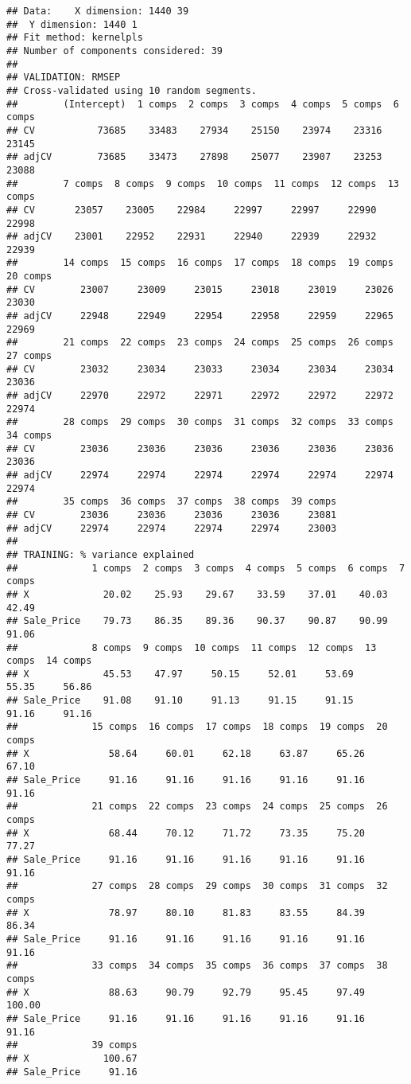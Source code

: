 \documentclass[
]{article}
\begin{document}
\begin{verbatim}
## Data:    X dimension: 1440 39 
##  Y dimension: 1440 1
## Fit method: kernelpls
## Number of components considered: 39
## 
## VALIDATION: RMSEP
## Cross-validated using 10 random segments.
##        (Intercept)  1 comps  2 comps  3 comps  4 comps  5 comps  6 comps
## CV           73685    33483    27934    25150    23974    23316    23145
## adjCV        73685    33473    27898    25077    23907    23253    23088
##        7 comps  8 comps  9 comps  10 comps  11 comps  12 comps  13 comps
## CV       23057    23005    22984     22997     22997     22990     22998
## adjCV    23001    22952    22931     22940     22939     22932     22939
##        14 comps  15 comps  16 comps  17 comps  18 comps  19 comps  20 comps
## CV        23007     23009     23015     23018     23019     23026     23030
## adjCV     22948     22949     22954     22958     22959     22965     22969
##        21 comps  22 comps  23 comps  24 comps  25 comps  26 comps  27 comps
## CV        23032     23034     23033     23034     23034     23034     23036
## adjCV     22970     22972     22971     22972     22972     22972     22974
##        28 comps  29 comps  30 comps  31 comps  32 comps  33 comps  34 comps
## CV        23036     23036     23036     23036     23036     23036     23036
## adjCV     22974     22974     22974     22974     22974     22974     22974
##        35 comps  36 comps  37 comps  38 comps  39 comps
## CV        23036     23036     23036     23036     23081
## adjCV     22974     22974     22974     22974     23003
## 
## TRAINING: % variance explained
##             1 comps  2 comps  3 comps  4 comps  5 comps  6 comps  7 comps
## X             20.02    25.93    29.67    33.59    37.01    40.03    42.49
## Sale_Price    79.73    86.35    89.36    90.37    90.87    90.99    91.06
##             8 comps  9 comps  10 comps  11 comps  12 comps  13 comps  14 comps
## X             45.53    47.97     50.15     52.01     53.69     55.35     56.86
## Sale_Price    91.08    91.10     91.13     91.15     91.15     91.16     91.16
##             15 comps  16 comps  17 comps  18 comps  19 comps  20 comps
## X              58.64     60.01     62.18     63.87     65.26     67.10
## Sale_Price     91.16     91.16     91.16     91.16     91.16     91.16
##             21 comps  22 comps  23 comps  24 comps  25 comps  26 comps
## X              68.44     70.12     71.72     73.35     75.20     77.27
## Sale_Price     91.16     91.16     91.16     91.16     91.16     91.16
##             27 comps  28 comps  29 comps  30 comps  31 comps  32 comps
## X              78.97     80.10     81.83     83.55     84.39     86.34
## Sale_Price     91.16     91.16     91.16     91.16     91.16     91.16
##             33 comps  34 comps  35 comps  36 comps  37 comps  38 comps
## X              88.63     90.79     92.79     95.45     97.49    100.00
## Sale_Price     91.16     91.16     91.16     91.16     91.16     91.16
##             39 comps
## X             100.67
## Sale_Price     91.16
\end{verbatim}
\end{document}
